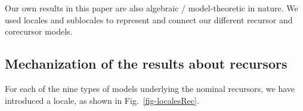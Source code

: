 Our own results in this paper are also algebraic / model-theoretic in nature. We used locales and sublocales to represent and connect our different recursor and corecursor models. 


\subsection{Mechanization of the results about recursors}
\label{subapp-isa-recursors}

For each of the nine types of models underlying the nominal recursors, we have introduced a locale, as shown in Fig.~\ref{fig-localesRec}. 

\newcommand\ThAll{\small \textsf{All}}

\newcommand\PermFree{\small \textsf{PermFree$\_$\allowbreak{}model}}
\newcommand\PermFreeV{\small \textsf{PermFreeV$\_$\allowbreak{}model}}
\newcommand\SwapFreeV{\small \textsf{SwapFreeV$\_$\allowbreak{}model}}
\newcommand\SwapFree{\small \textsf{SwapFree$\_$\allowbreak{}model}}
\newcommand\SwapFreshV{\small \textsf{SwapFreshV$\_$\allowbreak{}model}}
\newcommand\SwapFresh{\small \textsf{SwapFresh$\_$\allowbreak{}model}}
\newcommand\SwapFreshSM{\small \textsf{submodel$\_$\allowbreak{}SwapFresh$\_$\allowbreak{}model}}
\newcommand\SubstFresh{\small \textsf{SubstFresh$\_$\allowbreak{}model}}
\newcommand\Renaming{\small \textsf{Renaming$\_$\allowbreak{}model}}
\newcommand\RenamingFreshV{\small \textsf{RenamingFreshV$\_$\allowbreak{}model}}


\newcommand\LambdaTerms
{\small \textsf{Lambda$\_$\allowbreak{}Terms}}
\newcommand\SwapVsPerm
{\small \textsf{Swap$\_$\allowbreak{}vs$\_$\allowbreak{}Perms}}
\newcommand\SwapSeveral
{\small \textsf{SwapFresh$\_$\allowbreak{}SwapFreshV$\_$\allowbreak{}SwapFree$\_$\allowbreak{}models}}
\newcommand\RenamingIsRenamingFreshV
{\small \textsf{Renaming$\_$\allowbreak{}model$\_$\allowbreak{}is$\_$\allowbreak{}RenamingFreshV$\_$\allowbreak{}submodel}}

\newcommand\SwapFreshHasSwapFreeV
{\small \textsf{SwapFresh$\_$\allowbreak{}model$\_$\allowbreak{}has$\_$\allowbreak{}SwapFreeV$\_$\allowbreak{}submodel}}

\newcommand\RenamingFreshVR
{\small \textsf{RenamingFreshV$\_$\allowbreak{}recursor}}

\newcommand\SwapFreshR
{\small \textsf{SwapFresh$\_$\allowbreak{}recursor}}

\newcommand\SubstFreshR
{\small \textsf{SubstFresh$\_$\allowbreak{}recursor}}



